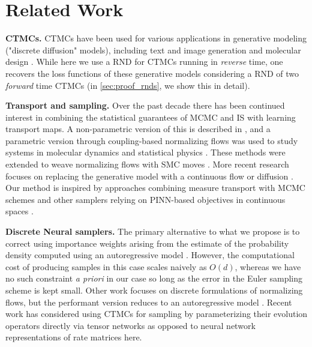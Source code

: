 \section{Related Work}
\label{sec:related_work}
\textbf{CTMCs.} CTMCs \cite{campbell2022continuous} have been used for various applications in generative modeling ("discrete diffusion" models), including text and image generation \cite{shi2024simplified,gatdiscrete,shaul2024flow, sahoo2024simple} and molecular design \cite{gruver2023protein, campbell2024generative, lisanza2024}. While here we use a RND for CTMCs running in \emph{reverse} time, one recovers the loss functions of these generative models considering a RND of two \emph{forward} time CTMCs (in \cref{sec:proof_rnds}, we show this in detail).

\textbf{Transport and sampling.}
Over the past decade there has been continued interest in combining the statistical guarantees of MCMC and IS with learning transport maps. A non-parametric version of this is described in \cite{marzouk2016}, and a parametric version through coupling-based normalizing flows was used to study systems in molecular dynamics and statistical physics \cite{noe2019, albergo2019, gabrie2022, wang2022}. These methods were extended to weave normalizing flows with SMC moves \cite{arbel2021, matthews2022}. More recent research focuses on replacing the generative model with a continuous flow or diffusion \cite{zhang2022path, vargas2023denoising, akhound2024iterated, sun2024}. Our method is inspired by approaches combining measure transport with MCMC schemes \cite{albergo2024nets, vargas2024transport} and other samplers relying on PINN-based objectives in continuous spaces \citep{mate2023learning, tian2024, sun2024}.

\textbf{Discrete Neural samplers.} The primary alternative to what we propose is to correct using importance weights arising from the estimate of the probability density computed using an autoregressive model \cite{nicoli2020}. However, the computational cost of producing samples in this case scales naively as $O(d)$, whereas we have no such constraint \textit{a priori} in our case so long as the error in the Euler sampling scheme is kept small. Other work focuses on discrete formulations of normalizing flows, but the performant version reduces to an autoregressive model \cite{tran2019}. Recent work has considered using CTMCs for sampling by parameterizing their evolution operators directly via tensor networks \citep{causer2025discrete} as opposed to neural network representations of rate matrices here. 

